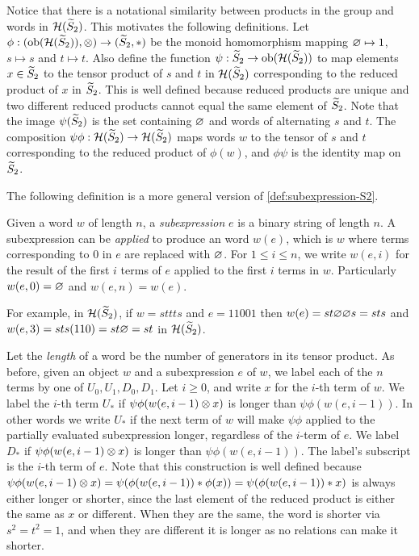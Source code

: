 Notice that there is a notational similarity between products in the group and words in $\mathcal{H}(\widetilde{S}_2)$. This motivates the following definitions. Let $\phi: (\operatorname{ob}(\mathcal{H}(\widetilde{S}_2)), \otimes) \to (\widetilde{S}_2, *)$ be the monoid homomorphism mapping $\varnothing \mapsto 1$, $s \mapsto s$ and $t \mapsto t$. Also define the function $\psi: \widetilde{S}_2 \to \operatorname{ob}(\mathcal{H}(\widetilde{S}_2))$ to map elements $x \in \widetilde{S}_2$ to the tensor product of $s$ and $t$ in $\mathcal{H}(\widetilde{S}_2)$ corresponding to the reduced product of $x$ in $\widetilde{S}_2$. This is well defined because reduced products are unique and two different reduced products cannot equal the same element of $\widetilde{S}_2$. Note that the image $\psi(\widetilde{S}_2)$ is the set containing $\varnothing$ and words of alternating $s$ and $t$. The composition $\psi\phi: \mathcal{H}(\widetilde{S}_2) \to \mathcal{H}(\widetilde{S}_2)$ maps words $w$ to the tensor of $s$ and $t$ corresponding to the reduced product of $\phi(w)$, and $\phi\psi$ is the identity map on $\widetilde{S}_2$.

The following definition is a more general version of \autoref{def:subexpression-S2}.
\begin{definition}[Subexpression]
    Given a word $w$ of length $n$, a \textit{subexpression} $e$ is a binary string of length $n$. A subexpression can be \textit{applied} to produce an word $w(e)$, which is $w$ where terms corresponding to $0$ in $e$ are replaced with $\varnothing$. For $1 \leq i \leq n$, we write $w(e,i)$ for the result of the first $i$ terms of $e$ applied to the first $i$ terms in $w$. Particularly $w(e,0) = \varnothing$ and $w(e,n) = w(e)$.
\end{definition}

For example, in $\mathcal{H}(\widetilde{S}_2)$, if $w = sttts$ and $e=11001$ then $w(e) = st \varnothing \varnothing s = sts$ and $w(e,3) = sts(110) = st\varnothing = st$ in $\mathcal{H}(\widetilde{S}_2)$.

Let the \textit{length} of a word be the number of generators in its tensor product. As before, given an object $w$ and a subexpression $e$ of $w$, we label each of the $n$ terms by one of $U_0, U_1, D_0, D_1$. Let $i \geq 0$, and write $x$ for the $i$-th term of $w$. We label the $i$-th term $U_*$ if $\psi\phi(w(e,i-1) \otimes x)$ is longer than $\psi\phi(w(e,i-1))$. In other words we write $U_*$ if the next term of $w$ will make $\psi\phi$ applied to the partially evaluated subexpression longer, regardless of the $i$-term of $e$. We label $D_*$ if $\psi\phi(w(e,i-1) \otimes x)$ is longer than $\psi\phi(w(e,i-1))$. The label's subscript is the $i$-th term of $e$. Note that this construction is well defined because $\psi\phi(w(e,i-1) \otimes x) = \psi(\phi(w(e,i-1)) * \phi(x)) = \psi(\phi(w(e,i-1)) * x)$ is always either longer or shorter, since the last element of the reduced product is either the same as $x$ or different. When they are the same, the word is shorter via $s^2 = t^2 = 1$, and when they are different it is longer as no relations can make it shorter.

